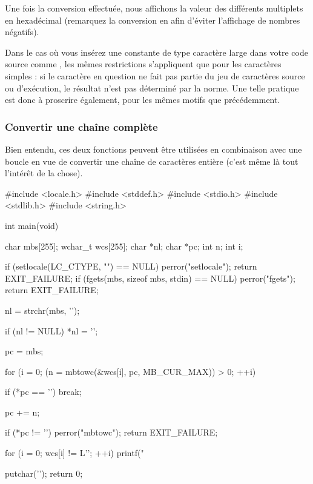 Une fois la conversion effectuée, nous affichons la valeur des
différents multiplets en hexadécimal (remarquez la conversion en
 afin d'éviter l'affichage de nombres négatifs).

\begin{attentionbox}
  Dans le cas où vous insérez une
constante de type caractère large dans votre code source comme
, les mêmes restrictions
s'appliquent que pour les caractères simples : si le caractère en
question ne fait pas partie du jeu de caractères source ou d'exécution,
le résultat n'est pas déterminé par la norme. Une telle pratique est
donc à proscrire également, pour les mêmes motifs que précédemment.
\end{attentionbox}


\subsubsection{Convertir une chaîne complète}
\label{convertir-une-chaine-complete}

Bien entendu, ces deux fonctions peuvent être utilisées en combinaison
avec une boucle en vue de convertir une chaîne de caractères entière
(c'est même là tout l'intérêt de la chose).

\begin{C}
#include <locale.h>
#include <stddef.h>
#include <stdio.h>
#include <stdlib.h>
#include <string.h>


int main(void)
{
    char mbs[255];
    wchar_t wcs[255];
    char *nl;
    char *pc;
    int n;
    int i;

    if (setlocale(LC_CTYPE, "") == NULL)
    {
        perror("setlocale");
        return EXIT_FAILURE;
    }
    if (fgets(mbs, sizeof mbs, stdin) == NULL)
    {
        perror("fgets");
        return EXIT_FAILURE;
    }

    nl = strchr(mbs, '\n');

    if (nl != NULL)
        *nl = '\0';

    pc = mbs;

    for (i = 0; (n = mbtowc(&wcs[i], pc, MB_CUR_MAX)) > 0; ++i)
    {
        if (*pc == '\0')
            break;

        pc += n;
    }

    if (*pc != '\0')
    {
        perror("mbtowc");
        return EXIT_FAILURE;
    }

    for (i = 0; wcs[i] != L'\0'; ++i)
        printf("%

    putchar('\n');
    return 0;
}
\end{C}

